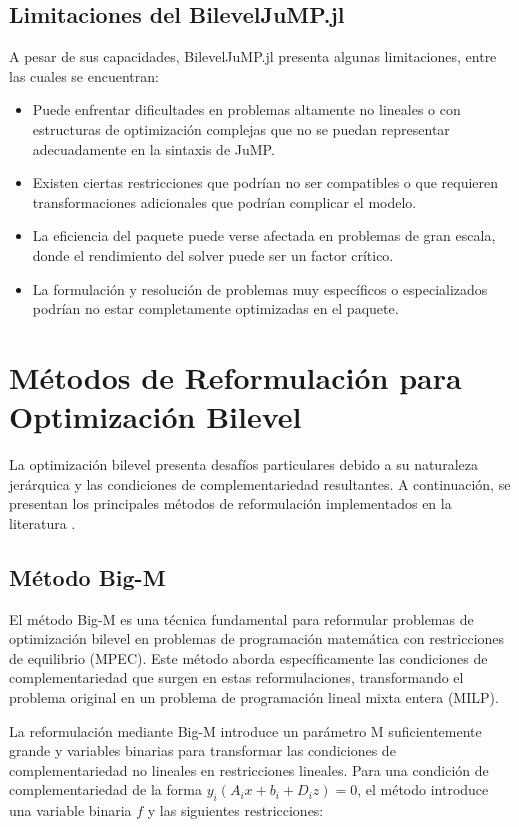 \subsection{Limitaciones del BilevelJuMP.jl}

A pesar de sus capacidades, BilevelJuMP.jl presenta algunas limitaciones, entre las cuales se encuentran:

\begin{itemize}
    \item Puede enfrentar dificultades en problemas altamente no lineales o con estructuras de optimización complejas que no se puedan representar adecuadamente en la sintaxis de JuMP.
    \item Existen ciertas restricciones que podrían no ser compatibles o que requieren transformaciones adicionales que podrían complicar el modelo.
    \item La eficiencia del paquete puede verse afectada en problemas de gran escala, donde el rendimiento del solver puede ser un factor crítico.
    \item La formulación y resolución de problemas muy específicos o especializados podrían no estar completamente optimizadas en el paquete.
\end{itemize}


\section{Métodos de Reformulación para Optimización Bilevel}

La optimización bilevel presenta desafíos particulares debido a su naturaleza jerárquica y las condiciones de complementariedad resultantes. A continuación, se presentan los principales métodos de reformulación implementados en la literatura \cite{BilevelJump}.

\subsection{Método Big-M}

El método Big-M es una técnica fundamental para reformular problemas de optimización bilevel en problemas de programación matemática con restricciones de equilibrio (MPEC). Este método aborda específicamente las condiciones de complementariedad que surgen en estas reformulaciones, transformando el problema original en un problema de programación lineal mixta entera (MILP).

La reformulación mediante Big-M introduce un parámetro M suficientemente grande y variables binarias para transformar las condiciones de complementariedad no lineales en restricciones lineales. Para una condición de complementariedad de la forma $y_i(A_ix + b_i + D_iz) = 0$, el método introduce una variable binaria $f$ y las siguientes restricciones:

